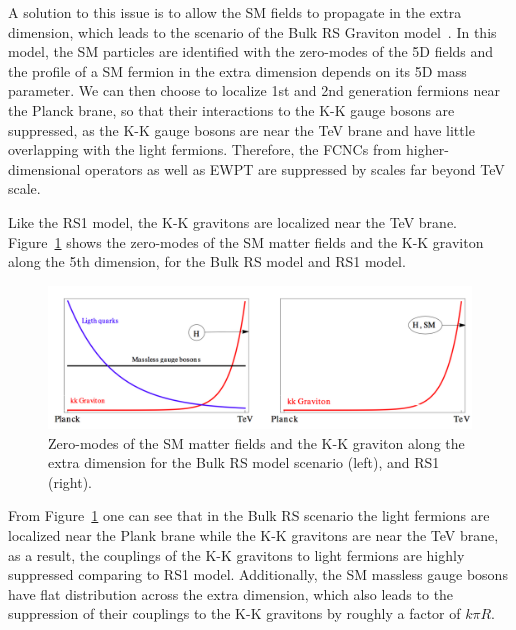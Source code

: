 \vspace{0.3cm}
A solution to this issue is to allow the SM fields to propagate in the extra dimension, which leads to the scenario of the Bulk RS Graviton model~\cite{intro_bulkref1,intro_bulkref2,intro_bulkref3}. In this model, the SM particles are identified with the zero-modes of the 5D fields and the profile of a SM fermion in the extra dimension depends on its 5D mass parameter. We can then choose to localize 1st and 2nd generation fermions near the Planck brane, so that their interactions to the K-K gauge bosons are suppressed, as the K-K gauge bosons are near the TeV brane and have little overlapping with the light fermions. Therefore,  the FCNCs from higher-dimensional operators as well as EWPT are suppressed by scales far beyond TeV scale.

\vspace{0.3cm}
Like the RS1 model, the K-K gravitons are localized near the TeV brane. Figure~\ref{fig:intro_rsandbulk} shows the zero-modes of the SM matter fields and the K-K graviton along the 5th dimension, for the Bulk RS model and RS1 model.
\begin{figure}[htbp]
\begin{center}
\includegraphics[width=0.9\linewidth]{figures/intro_rsandbulk.png}
\caption{Zero-modes of the SM matter fields and the K-K graviton along the extra dimension for the Bulk RS model scenario (left), and RS1 (right).}
\label{fig:intro_rsandbulk}
\end{center}
\end{figure}

From Figure~\ref{fig:intro_rsandbulk} one can see that in the Bulk RS scenario the light fermions are localized near the Plank brane while the K-K gravitons are near the TeV brane, as a result, the couplings of the K-K gravitons to light fermions are highly suppressed comparing to RS1 model. Additionally, the SM massless gauge bosons have flat distribution across the extra dimension, which also leads to the suppression of their couplings to the K-K gravitons by roughly a factor of $k\pi R$.

